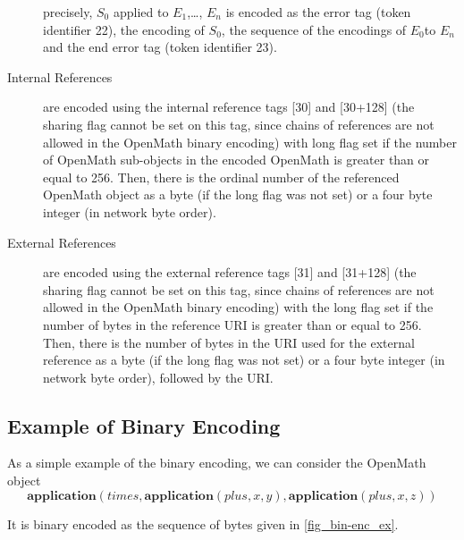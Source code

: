 \documentclass{report}
\def\OM{OpenMath\xspace}
\def\application#1{\mathbf{application}(#1)}
\begin{document}
\begin{description}
    precisely, $S_0$ applied to $E_1$,\ldots, $E_n$ is encoded as the error tag (token
    identifier 22), the encoding of $S_0$, the sequence of the encodings of $E_0$to $E_n$
    and the end error tag (token identifier 23).
\item[Internal References] are encoded using the internal reference tags [30] and [30+128]
  (the sharing flag cannot be set on this tag, since chains of references are not allowed
  in the \OM binary encoding) with long flag set if the number of \OM sub-objects in the
  encoded \OM is greater than or equal to 256. Then, there is the ordinal number of the
  referenced \OM object as a byte (if the long flag was not set) or a four byte integer
  (in network byte order).
\item[External References] are encoded using the external reference tags [31] and [31+128]
  (the sharing flag cannot be set on this tag, since chains of references are not allowed
  in the \OM binary encoding) with the long flag set if the number of bytes in the
  reference URI is greater than or equal to 256. Then, there is the number of bytes in the
  URI used for the external reference as a byte (if the long flag was not set) or a four
  byte integer (in network byte order), followed by the URI.
\end{description} 

\subsection{Example of Binary Encoding}\label{sec_bin_example}

As a simple
example of the binary encoding, we can consider the \OM object
\[\application{times,\application{plus,x,y},\application{plus,x,z}}\]

It is binary encoded as the sequence of bytes given in \ref{fig_bin-enc_ex}.
\end{document}
